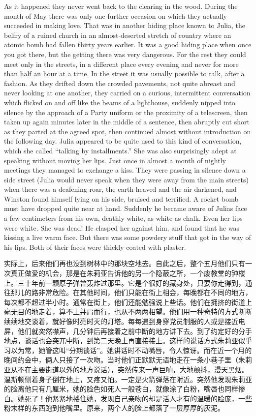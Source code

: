 \begin{paracol}{2}
As it happened they never went back to the clearing in the wood. During
the month of May there was only one further occasion on which they
actually succeeded in making love. That was in another hiding place
known to Julia, the belfry of a ruined church in an almost-deserted
stretch of country where an atomic bomb had fallen thirty years earlier.
It was a good hiding place when once you got there, but the getting
there was very dangerous. For the rest they could meet only in the
streets, in a different place every evening and never for more than half
an hour at a time. In the street it was usually possible to talk, after
a fashion. As they drifted down the crowded pavements, not quite abreast
and never looking at one another, they carried on a curious,
intermittent conversation which flicked on and off like the beams of a
lighthouse, suddenly nipped into silence by the approach of a Party
uniform or the proximity of a telescreen, then taken up again minutes
later in the middle of a sentence, then abruptly cut short as they
parted at the agreed spot, then continued almost without introduction on
the following day. Julia appeared to be quite used to this kind of
conversation, which she called ``talking by installments.'' She was also
surprisingly adept at speaking without moving her lips. Just once in
almost a month of nightly meetings they managed to exchange a kiss. They
were passing in silence down a side street (Julia would never speak when
they were away from the main streets) when there was a deafening roar,
the earth heaved and the air darkened, and Winston found himself lying
on his side, bruised and terrified. A rocket bomb must have dropped
quite near at hand. Suddenly he became aware of Julia\textquotesingle s
face a few centimeters from his own, deathly white, as white as chalk.
Even her lips were white. She was dead! He clasped her against him, and
found that he was kissing a live warm face. But there was some powdery
stuff that got in the way of his lips. Both of their faces were thickly
coated with plaster.

\switchcolumn

实际上，后来他们再也没到树林中的那块空地去。自此之后，整个五月他们只有一次真正做爱的机会，那是在朱莉亚告诉他的另一个隐蔽之所，一个废教堂的钟楼上。三十年前一颗原子弹曾轰炸过那里。它是个很好的藏身处，只要你走得到，通往那儿的路非常危险。在其他时间，他们只能在街上相会，每晚都在不同的地方，每次都不超过半小时。通常在街上，他们还能勉强说上些话。他们在拥挤的街道上毫无目的地走着，算不上并肩而行，也从不两两相望。他们用一种奇特的方式断断续续地交谈着，就好像时亮时灭的灯塔。每每遇到身穿党员制服的人或是接近电屏，他们就突然噤声，几分钟后再接着之前中断的地方讲下去。到了约定好的分手地点，谈话也会突兀中断，到第二天晚上再直接接上。这样的说话方式朱莉亚似乎习以为常，她管这叫``分期谈话''。她讲话时不动嘴唇，令人惊讶。而在近一个月的晚间约会中，俩人只接了一次吻。当时他们正默默无语地走在一条小巷子里（朱莉亚从不在主要街道以外的地方说话），突然传来一声巨响，大地颤抖，漫天黑烟。温斯顿侧着身子倒在地上，又疼又怕。一定是火箭弹落在附近。突然他发现朱莉亚的脸离他只有几厘米，她的脸色如死人一般苍白，就像涂了白粉，嘴唇也同样惨白。她死了！他紧紧地搂住她，发现自己亲吻的却是活人才有的温暖的脸庞，一些粉末样的东西跑到他嘴里。原来，两个人的脸上都落了一层厚厚的灰泥。


\end{paracol}
